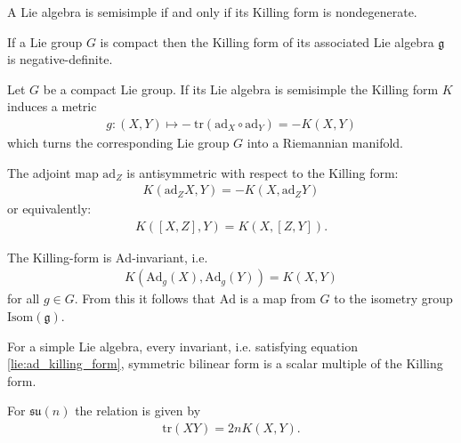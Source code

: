     \begin{theorem}
        A Lie algebra is semisimple if and only if its Killing form is nondegenerate.
    \end{theorem}

    \begin{property}
        If a Lie group $G$ is compact then the Killing form of its associated Lie algebra $\mathfrak{g}$ is negative-definite.
    \end{property}
    \begin{result}
        Let $G$ be a compact Lie group. If its Lie algebra is semisimple the Killing form $K$ induces a metric
        \begin{gather}
            g:(X, Y)\mapsto -\ \text{tr}(\text{ad}_X\circ\text{ad}_Y) = -K(X, Y)
        \end{gather}
        which turns the corresponding Lie group $G$ into a Riemannian manifold.
    \end{result}

    \begin{property}
        The adjoint map $\text{ad}_Z$ is antisymmetric with respect to the Killing form:
        \begin{gather}
            \label{lie:ad_killing_form}
            K(\text{ad}_ZX, Y) = -K(X, \text{ad}_ZY)
        \end{gather}
        or equivalently:
        \begin{gather}
            K([X, Z], Y) = K(X, [Z, Y]).
        \end{gather}
    \end{property}
    \begin{property}
        The Killing-form is $\text{Ad}$-invariant, i.e.
        \begin{gather}
            K(\text{Ad}_g(X), \text{Ad}_g(Y)) = K(X, Y)
        \end{gather}
        for all $g\in G$. From this it follows that $\text{Ad}$ is a map from $G$ to the isometry group $\text{Isom}(\mathfrak{g})$.
    \end{property}

    \begin{property}\label{lie:killing_trace}
        For a simple Lie algebra, every invariant, i.e. satisfying equation \ref{lie:ad_killing_form}, symmetric bilinear form is a scalar multiple of the Killing form.
    \end{property}
    \begin{example}
        For $\mathfrak{su}(n)$ the relation is given by
        \begin{gather}
            \text{tr}(XY) = 2nK(X, Y).
        \end{gather}
    \end{example}


